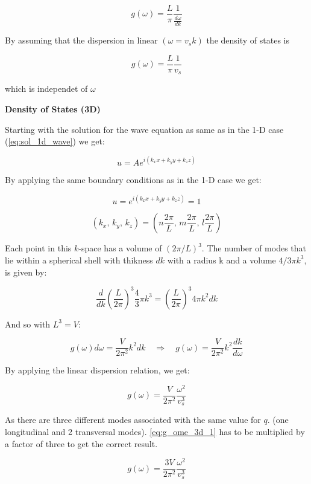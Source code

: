 \begin{equation}
    g(\omega) = \frac{L}{\pi} \frac{1}{\frac{d\omega}{d k}}
\end{equation}

By assuming that the dispersion in linear $(\omega = v_sk)$ 
the density of states is

\begin{equation}
    g(\omega) = \frac{L}{\pi} \frac{1}{v_s}
\end{equation}

which is independet of $\omega$

\textbf{Density of States (3D)}

Starting with the solution for the wave equation as same as in the 1-D case
(\autoref{eq:sol_1d_wave}) we get:

\begin{equation}
    u = Ae^{i(k_x x + k_y y + k_z z)}
\end{equation}

By applying the same boundary conditions as in the 1-D case we get:

$$u = e^{i(k_x x + k_y y + k_z z)} = 1$$

$$(k_x, \, k_y,\, k_z) = (n \frac{2\pi}{L}, \, m \frac{2\pi}{L}, \, l \frac{2\pi}{L})$$

Each point in this $k$-space has a volume of $(2\pi/L)^3$. The number of
modes that lie within a spherical shell with thikness $dk$ with a radius k 
and a volume $4/3\pi k^3$, is given by:

$$\frac{d}{dk}{(\frac{L}{2\pi})}^3\frac{4}{3}\pi k^3 = {(\frac{L}{2\pi})}^3 4\pi k^2 dk$$

And so with $L^3 = V$:

$$ g(\omega) d \omega =  \frac{V}{2\pi^2} k^2 dk \quad \Rightarrow \quad g(\omega) = \frac{V}{2\pi^2} k^2 \frac{dk}{d \omega} $$

By applying the linear dispersion relation, we get:

\begin{equation}
    g(\omega) = \frac{V}{2\pi^2} \frac{\omega^2}{v_s^3}
    \label{eq:g_ome_3d_1}
\end{equation}

As there are three different modes associated with the same value for $q$.
(one longitudinal and 2 transversal modes). \autoref{eq:g_ome_3d_1} has to be
multiplied by a factor of three to get the correct result.

\begin{equation}
    g(\omega) = \frac{3V}{2\pi^2} \frac{\omega^2}{v_s^3}
\end{equation}


